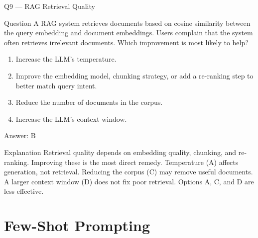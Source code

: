 \documentclass[aspectratio=169,8pt]{beamer}
\begin{document}
	\begin{frame}{Q9 --- RAG Retrieval Quality}
		\begin{block}{Question}
			A RAG system retrieves documents based on cosine similarity between the query embedding and document embeddings. Users complain that the system often retrieves irrelevant documents. Which improvement is most likely to help?
			\begin{enumerate}
				\item Increase the LLM's temperature.
				\item Improve the embedding model, chunking strategy, or add a re-ranking step to better match query intent.
				\item Reduce the number of documents in the corpus.
				\item Increase the LLM's context window.
			\end{enumerate}
		\end{block}
		\begin{exampleblock}{Answer: B}\end{exampleblock}
		\begin{block}{Explanation}
			Retrieval quality depends on embedding quality, chunking, and re-ranking. Improving these is the most direct remedy. Temperature (A) affects generation, not retrieval. Reducing the corpus (C) may remove useful documents. A larger context window (D) does not fix poor retrieval. Options A, C, and D are less effective.
		\end{block}
	\end{frame}
	
	\section{Few-Shot Prompting}
	
\end{document}
